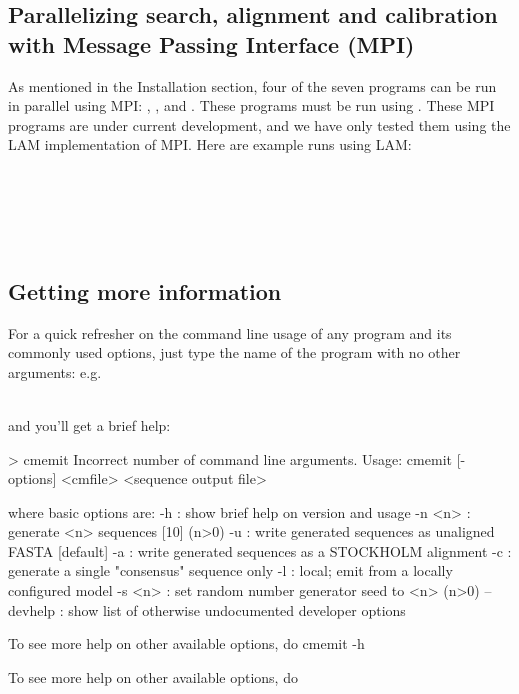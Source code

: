 \subsection{Parallelizing search, alignment and calibration with Message Passing
  Interface (MPI)}
As mentioned in the Installation section, four of
the seven  programs can be run in parallel using
MPI: , ,  and .
These programs must be run using . These MPI programs are
under current development, and we have only tested them using the LAM
implementation of MPI. Here are example runs using LAM:  

\\

\\

\\

\\

\subsection{Getting more information}

For a quick refresher on the command line usage of any program and its
commonly used options, just type the name of the program with no other
arguments: e.g.\

\\

and you'll get a brief help:

\begin{sreoutput}
> cmemit
Incorrect number of command line arguments.
Usage: cmemit [-options] <cmfile> <sequence output file>

  where basic options are:
  -h        : show brief help on version and usage
  -n <n>    : generate <n> sequences  [10]  (n>0)
  -u        : write generated sequences as unaligned FASTA  [default]
  -a        : write generated sequences as a STOCKHOLM alignment
  -c        : generate a single "consensus" sequence only
  -l        : local; emit from a locally configured model
  -s <n>    : set random number generator seed to <n>  (n>0)
  --devhelp : show list of otherwise undocumented developer options

To see more help on other available options, do cmemit -h
\end{sreoutput}
To see more help on other available options, do 

